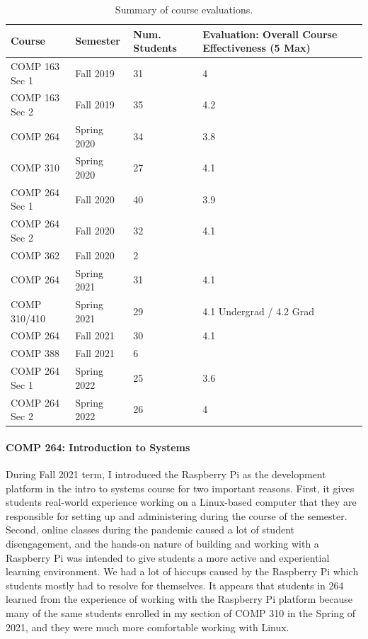 \documentclass[10pt,onecolumn]{article}
\begin{document}
\begin{table}[t]
\centering
\begin{tabular}{llll}
\textbf{Course} & \textbf{Semester} & \textbf{Num. Students} & \textbf{Evaluation: Overall Course Effectiveness (5 Max)} \\ \toprule
COMP 163 Sec 1 & Fall 2019 & 31 & 4 \\
COMP 163 Sec 2 & Fall 2019 & 35 & 4.2 \\
COMP 264       & Spring 2020 & 34 & 3.8 \\
COMP 310       & Spring 2020 & 27 & 4.1 \\
COMP 264 Sec 1 & Fall 2020   & 40 & 3.9 \\ 
COMP 264 Sec 2 & Fall 2020   & 32 & 4.1 \\
COMP 362       & Fall 2020   & 2  &     \\
COMP 264       & Spring 2021 & 31 & 4.1 \\
COMP 310/410   & Spring 2021 & 29 & 4.1 Undergrad / 4.2 Grad \\
COMP 264       & Fall 2021   & 30 & 4.1 \\
COMP 388       & Fall 2021   & 6  & \\
COMP 264 Sec 1 & Spring 2022 & 25 & 3.6 \\
COMP 264 Sec 2 & Spring 2022 & 26 & 4 \\
\end{tabular}
\caption{Summary of course evaluations.}
\label{tab:studentreviews}
\end{table}


\paragraph{COMP 264: Introduction to Systems}
During Fall 2021 term, I introduced the Raspberry Pi as the development platform in the intro to systems course for two important reasons.
First, it gives students real-world experience working on a Linux-based computer that they are responsible for setting up and administering during the course of the semester.
Second, online classes during the pandemic caused a lot of student disengagement, and the hands-on nature of building and working with a Raspberry Pi was intended to give students a more active and experiential learning environment.
We had a lot of hiccups caused by the Raspberry Pi which students mostly had to resolve for themselves.
It appears that students in 264 learned from the experience of working with the Raspberry Pi platform because many of the same students enrolled in my section of COMP 310 in the Spring of 2021, and they were much more comfortable working with Linux.
\end{document}
